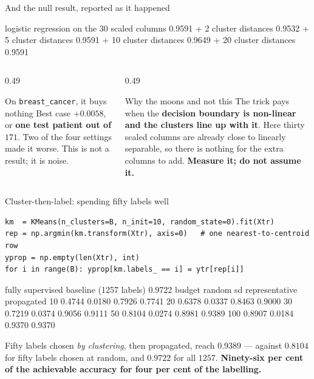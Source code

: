 \documentclass[aspectratio=169]{beamer}
\begin{document}
\begin{frame}[fragile,shrink=6]{And the null result, reported as it happened}
\begin{outblk}
logistic regression on the 30 scaled columns  0.9591
   +  2 cluster distances                     0.9532
   +  5 cluster distances                     0.9591
   + 10 cluster distances                     0.9649
   + 20 cluster distances                     0.9591
\end{outblk}
  \begin{columns}[T]
    \begin{column}{0.49\textwidth}
      \begin{block}{On \texttt{breast\_cancer}, it buys nothing}
        Best case $+0.0058$, or \textbf{one test patient out of $171$}. Two
        of the four settings made it worse. This is not a result; it is
        noise.
      \end{block}
    \end{column}
    \begin{column}{0.49\textwidth}
      \begin{alertblock}{Why the moons and not this}
        The trick pays when the \textbf{decision boundary is non-linear and
        the clusters line up with it}. Here thirty scaled columns are already
        close to linearly separable, so there is nothing for the extra
        columns to add. \textbf{Measure it; do not assume it.}
      \end{alertblock}
    \end{column}
  \end{columns}
\end{frame}

\begin{frame}[fragile,shrink=10]{Cluster-then-label: spending fifty labels well}
\begin{lstlisting}
km  = KMeans(n_clusters=B, n_init=10, random_state=0).fit(Xtr)
rep = np.argmin(km.transform(Xtr), axis=0)   # one nearest-to-centroid row
yprop = np.empty(len(Xtr), int)
for i in range(B): yprop[km.labels_ == i] = ytr[rep[i]]
\end{lstlisting}
\begin{outblk}
fully supervised baseline (1257 labels) 0.9722
 budget     random       sd   representative    propagated
     10     0.4744   0.0180           0.7926        0.7741
     20     0.6378   0.0337           0.8463        0.9000
     30     0.7219   0.0374           0.9056        0.9111
     50     0.8104   0.0274           0.8981        0.9389
    100     0.8907   0.0184           0.9370        0.9370
\end{outblk}
  \begin{center}\small
    Fifty labels chosen \emph{by clustering}, then propagated, reach
    $\mathbf{0.9389}$ --- against $0.8104$ for fifty labels chosen at random,
    and $0.9722$ for all $1257$. \textbf{Ninety-six per cent of the
    achievable accuracy for four per cent of the labelling.}
  \end{center}
\end{frame}
\end{document}
